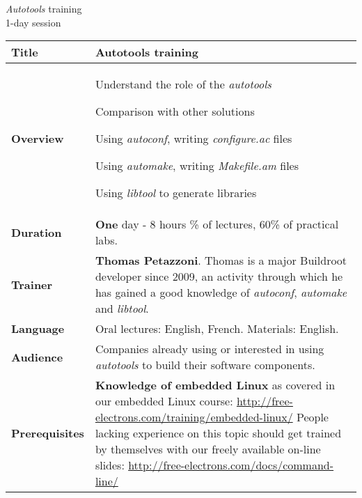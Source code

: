 \documentclass[a4paper,12pt,obeyspaces,spaces,hyphens]{article}
\begin{document}
\thispagestyle{fancy}

\setlength{\arrayrulewidth}{0.8pt}

\begin{center}
\LARGE
{\em Autotools} training\\
\large
1-day session
\end{center}
\vspace{1cm}

\small
{}

 {
  \begin{tabularx}{\textwidth}{|g|h|}
    {\bf Title} & {\bf Autotools training} \\
    \hline

    {\bf Overview} &
    Understand the role of the {\em autotools} \par
    Comparison with other solutions \par
    Using {\em autoconf}, writing {\em configure.ac} files \par
    Using {\em automake}, writing {\em Makefile.am} files \par
    Using {\em libtool} to generate libraries \\
    \hline

    {\bf Duration} & {\bf One} day - 8 hours
    \% of lectures, 60\% of practical labs. \\
    \hline

    {\bf Trainer} & {\bf Thomas Petazzoni}. Thomas is a major
    Buildroot developer since 2009, an activity through which he has
    gained a good knowledge of {\em autoconf}, {\em automake} and {\em
      libtool}.\\
    \hline

    {\bf Language} & Oral lectures: English, French.
    \newline Materials: English.\\
    \hline

    {\bf Audience} & Companies already using or interested in using
    {\em autotools} to build their software components.\\
    \hline

    {\bf Prerequisites} & {\bf Knowledge of embedded Linux} as covered
    in our embedded Linux course:
    \newline \url{http://free-electrons.com/training/embedded-linux/} \vspace{1em}
    \newline People lacking experience on this topic should get
    trained by themselves with our freely available on-line slides:
    \newline \url{http://free-electrons.com/docs/command-line/} \\
    \hline
  \end{tabularx}

}
\end{document}
